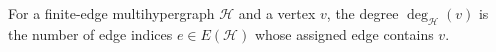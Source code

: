 \begin{definition}
For a finite-edge multihypergraph $\mathcal H$ and a vertex $v$, the degree
$\deg_{\mathcal H}(v)$ is the number of edge indices $e\in E(\mathcal H)$
whose assigned edge contains $v$.
\end{definition}
